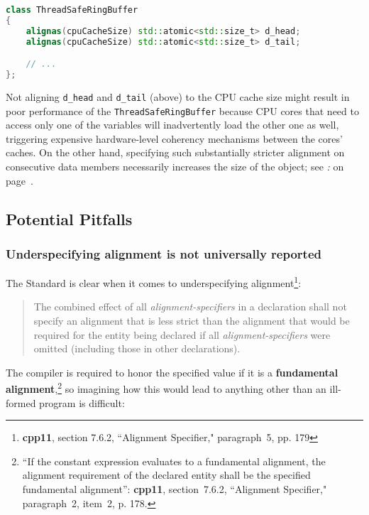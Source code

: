 \begin{lstlisting}[language=C++]
class ThreadSafeRingBuffer
{
    alignas(cpuCacheSize) std::atomic<std::size_t> d_head;
    alignas(cpuCacheSize) std::atomic<std::size_t> d_tail;

    // ...
};
\end{lstlisting}
    
\noindent Not aligning \texttt{d\_head} and \texttt{d\_tail} (above) to the CPU
cache size might result in poor performance of the
\texttt{ThreadSafeRingBuffer} because CPU cores that need to access only one
of the variables will inadvertently load the other one as well,
triggering expensive hardware-level coherency mechanisms between the
cores' caches. On the other hand, specifying such substantially stricter
alignment on consecutive data members necessarily increases the size of
the object; see {\it{}:} {\it{}} on page~\pageref{stricter-alignment-might-reduce-cache-utilization}.

\subsection[Potential Pitfalls]{Potential Pitfalls}\label{potential-pitfalls}

\subsubsection[Underspecifying alignment is not universally reported]{Underspecifying alignment is not universally reported}\label{underspecifying-alignment-is-not-universally-reported}

The Standard is clear when it comes to underspecifying
alignment{\cprotect\footnote{\textbf{{cpp11}}, section 7.6.2, ``Alignment Specifier," paragraph~5, pp. 179}}:
\begin{quote}
The combined effect of all \textit{alignment-specifiers} in a declaration
shall not specify an alignment that is less strict than the alignment
that would be required for the entity being declared if all
\textit{alignment-specifiers} were omitted (including those in other
declarations).
\end{quote} 
The compiler is required to honor the
specified value if it is a \textbf{fundamental
alignment},{\cprotect\footnote{``If the constant expression evaluates to
a fundamental alignment, the alignment requirement of the declared
entity shall be the specified fundamental alignment'': \textbf{cpp11}, section~7.6.2, ``Alignment Specifier," paragraph~2, item~2, p. 178.}} so
imagining how this would lead to anything other than an ill-formed
program is difficult:

